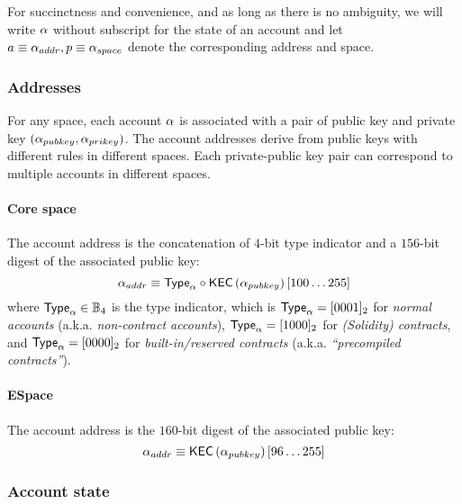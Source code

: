 For succinctness and convenience, and as long as there is no ambiguity, we will write $\mathbf{\alpha}$ without subscript for the state of an account and let $a\equiv \mathbf{\alpha}_{addr}, p\equiv \mathbf{\alpha}_{space}$ denote the corresponding address and space.

\subsubsection{Addresses}
%
For any space, each account $\mathbf{\alpha}$ is associated with a pair of public key and private key $\left(\mathbf{\alpha}_{pubkey}, \mathbf{\alpha}_{prikey}\right)$. The account addresses derive from public keys with different rules in different spaces. Each private-public key pair can correspond to multiple accounts in different spaces. 

\paragraph{Core space}

The account address is the concatenation of $4$-bit type indicator and a $156$-bit digest of the associated public key: 
\begin{equation}\label{eq:account-address}
	\mathbf{\alpha}_{addr} \equiv \mathsf{Type}_{\mathbf{\alpha}} \circ \mathsf{KEC} \left( \mathbf{\alpha}_{pubkey} \right)[100\dots 255]
\end{equation}
where $\mathsf{Type}_{\mathbf{\alpha}}\in \mathbb{B}_4$ is the type indicator,
which is $\mathsf{Type}_{\mathbf{\alpha}}=[0001]_2$ for \emph{normal accounts} (a.k.a. \emph{non-contract accounts}), $\mathsf{Type}_{\mathbf{\alpha}}=[1000]_2$ for \emph{(Solidity) contracts},
and $\mathsf{Type}_{\mathbf{\alpha}}=[0000]_2$ for \emph{built-in/reserved contracts} (a.k.a. \emph{``precompiled contracts''}).

\paragraph{ESpace}

The account address is the $160$-bit digest of the associated public key: 
\begin{equation}
	\mathbf{\alpha}_{addr} \equiv \mathsf{KEC} \left( \mathbf{\alpha}_{pubkey} \right)[96\dots 255]
\end{equation}

\subsubsection{Account state}

